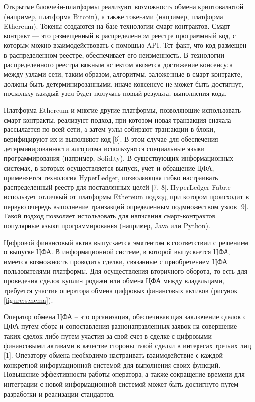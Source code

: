 \documentclass[a4paper, 10pt]{article}
\begin{document}
	Открытые блокчейн-платформы реализуют возможность обмена криптовалютой (например, платформа Bitcoin), а также токенами (например, платформа Ethereum). Токены создаются на базе технологии смарт-контрактов. Смарт-контракт — это размещенный в распределенном реестре программный код, с которым можно взаимодействовать с помощью API. Тот факт, что код размещен в распределенном реестре, обеспечивает его неизменность. В технологии распределенного реестра важным аспектом является достижение консенсуса между узлами сети, таким образом, алгоритмы, заложенные в смарт-контракте, должны быть детерминированными, иначе консенсус не может быть достигнут, поскольку каждый узел будет получать новый результат выполнения кода. 
	
	Платформа Ethereum и многие другие платформы, позволяющие использовать смарт-контракты, реализуют подход, при котором новая транзакция сначала рассылается по всей сети, а затем узлы собирают транзакции в блоки, верифицируют их и выполняют код [6]. В этом случае для обеспечения детерминированности алгоритма используются специальные языки программирования (например, Solidity). В существующих информационных системах, в которых осуществляется выпуск, учет и обращение ЦФА, применяется технология HyperLedger, позволяющая гибко настраивать распределенный реестр для поставленных целей [7, 8]. HyperLedger Fabric использует отличный от платформы Ethereum подход, при котором происходит в первую очередь выполнение транзакций определенным подмножеством узлов [9]. Такой подход позволяет использовать для написания смарт-контрактов популярные языки программирования (например, Java или Python).
	
	Цифровой финансовый актив выпускается эмитентом в соответствии с решением о выпуске ЦФА. В информационной системе, в которой выпускается ЦФА, имеется возможность проводить сделки, связанные с приобретением ЦФА пользователями платформы. Для осуществления вторичного оборота, то есть для проведения сделок купли-продажи или обмена ЦФА между владельцами, требуется участие оператора обмена цифровых финансовых активов (рисунок  \ref{figure:schema}). 
	
	Оператор обмена ЦФА – это организация, обеспечивающая заключение сделок с ЦФА путем сбора и сопоставления разнонаправленных заявок на совершение таких сделок либо путем участия за свой счет в сделке с цифровыми финансовыми активами в качестве стороны такой сделки в интересах третьих лиц [1]. Оператору обмена необходимо настраивать взаимодействие с каждой конкретной информационной системой для выполнения своих функций. Повышение эффективности работы оператора, а также сокращение времени для интеграции с новой информационной системой может быть достигнуто путем разработки и реализации стандартов. 
	
\end{document}
